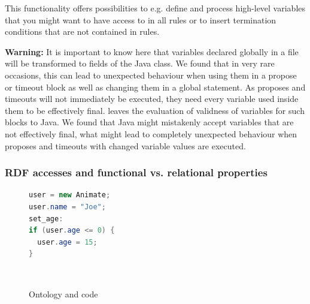 This functionality offers possibilities to e.g. define and process high-level variables that you might want to have access to in all rules or to insert termination conditions that are not contained in rules.


\textbf{Warning:} It is important to know here that variables declared globally in a file will be transformed to fields of the Java class. We found that in very rare occasions, this can lead to unexpected behaviour when using them in a propose or timeout block as well as changing them in a global statement. As proposes and timeouts will not immediately be executed, they need every variable used inside them to be effectively final. \vonda leaves the evaluation of validness of variables for such blocks to Java. We found that Java might mistakenly accept variables that are not effectively final, what might lead to completely unexpected behaviour when proposes and timeouts with changed variable values are executed.

\subsubsection{RDF accesses and functional vs. relational properties}
\label{sec:rdfaccesses}

\begin{figure}[htb]
\begin{minipage}{0.5\columnwidth}
\small%
\begin{lstlisting}[language=Java]
user = new Animate;
user.name = "Joe";
set_age:
if (user.age <= 0) {
  user.age = 15;
}
\end{lstlisting}
\end{minipage}\ \vrule\hspace{1ex}
\begin{minipage}{0.44\columnwidth}
    \small{}
\end{minipage}
  \caption{Ontology and \vonda code}
  \label{fig:rdfobjects}
\end{figure}

